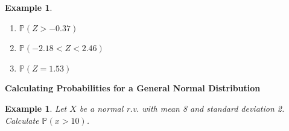 \documentclass[12pt]{amsart}
\newtheorem{example}[theorem]{Example}
\newcommand{\bP}{\mathbb{P}}
\begin{document}
{\begin{example}
\begin{enumerate}
\item $\bP( Z > -0.37 ) $
%

\vfill


\item $\bP( -2.18 < Z < 2.46 )$
%

\vfill


\item $\bP(Z = 1.53 ) $

\end{enumerate}


\end{example} 


\newpage



\newpage
\textbf{Calculating Probabilities for a General Normal Distribution} \newline

\begin{example}  Let $X$ be a normal r.v. with mean 8 and standard deviation 2.  \newline
Calculate $\bP(x>10)$.
\end{example} 


}
\end{document}
